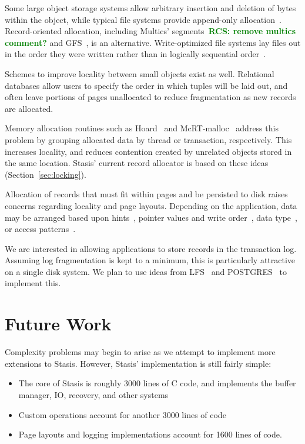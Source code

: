 \documentclass[letterpaper,twocolumn,10pt]{article}
\newcommand{\yad}{Stasis\xspace}
\newcommand{\yads}{Stasis'\xspace}
\newcommand{\rcs}[1]{\textcolor{green}{\bf RCS: #1}}
\begin{document}
Some large object storage systems allow arbitrary insertion and deletion of bytes~\cite{esm}
within the object, while typical file systems
provide append-only allocation~\cite{ffs}.
Record-oriented allocation, including Multics' segments~\cite{multics}\rcs{remove multics comment?} and GFS~\cite{gfs}, is an alternative.
Write-optimized file systems lay files out in the order they
were written rather than in logically sequential order~\cite{lfs}.  

Schemes to improve locality between small
objects exist as well. Relational databases allow users to specify the order
in which tuples will be laid out, and often leave portions of pages
unallocated to reduce fragmentation as new records are allocated.

Memory allocation routines such as Hoard~\cite{hoard} and
McRT-malloc~\cite{mcrt} address this problem by grouping allocated
data by thread or transaction, respectively.  This increases
locality, and reduces contention created by unrelated objects stored
in the same location.
\yads current record allocator is based on these ideas (Section~\ref{sec:locking}).

Allocation of records that must fit within pages and be persisted to
disk raises concerns regarding locality and page layouts.  Depending
on the application, data may be arranged based upon
hints~\cite{cricket}, pointer values and write order~\cite{starburst},
data type~\cite{orion}, or access
patterns~\cite{storageReorganization}.


We are interested in allowing applications to store records in
the transaction log.  Assuming log fragmentation is kept to a
minimum, this is particularly attractive on a single disk system.  We
plan to use ideas from LFS~\cite{lfs} and POSTGRES~\cite{postgres}
to implement this.

\section{Future Work}

Complexity problems may begin to arise as we attempt to implement more
extensions to \yad.  However, \yads implementation is still fairly simple:

\begin{itemize}
\item The core of \yad is roughly 3000 lines
of C code, and implements the buffer manager, IO, recovery, and other
systems
\item Custom operations account for another 3000 lines of code
\item Page layouts and logging implementations account for 1600 lines of code.
\end{itemize}
\end{document}
